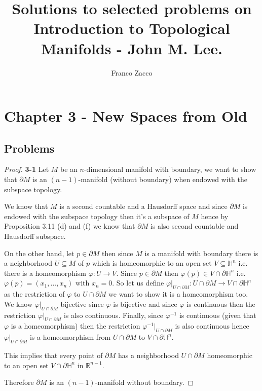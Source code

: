 \documentclass[11pt]{article}
\title{\textbf{Solutions to selected problems on Introduction to Topological Manifolds - John M. Lee.}}
\author{Franco Zacco}
\date{}
\theoremstyle{definition}
\begin{document}
\maketitle
\thispagestyle{empty}

\section*{Chapter 3 - New Spaces from Old}

\subsection*{Problems}

\begin{proof}{\textbf{3-1}}
    Let $M$ be an $n$-dimensional manifold with boundary, we want to show
    that $\partial M$ is an $(n-1)$-manifold (without boundary) when endowed
    with the subspace topology.

    We know that $M$ is a second countable and a Hausdorff space and since
    $\partial M$ is endowed with the subspace topology then it's
    a subspace of $M$ hence by Proposition 3.11 (d) and (f) we know that
    $\partial M$ is also second countable and Hausdorff subspace.

    On the other hand, let $p \in \partial M$ then since $M$ is a manifold
    with boundary there is a neighborhood $U \subseteq M$ of $p$ which is
    homeomorphic to an open set $V \subseteq \mathbb{H}^n$ i.e. there
    is a homeomorphism $\varphi: U \to V$. Since $p \in \partial M$ then
    $\varphi(p) \in V \cap \partial \mathbb{H}^n$ i.e.
    $\varphi(p) = (x_1, ..., x_n)$ with $x_n = 0$.
    So let us define
    $\varphi\big|_{U \cap \partial M}:
    U \cap \partial M \to V \cap \partial\mathbb{H}^n$
     as the restriction of $\varphi$
    to $U \cap \partial M$ we want to show it is a homeomorphism too.
    We know $\varphi\big|_{U \cap \partial M}$ bijective since
    $\varphi$ is bijective and since $\varphi$ is continuous then the
    restriction $\varphi\big|_{U \cap \partial M}$ is also continuous.
    Finally, since $\varphi^{-1}$ is continuous (given that $\varphi$ is
    a homeomorphism) then the restriction
    $\varphi^{-1}\big|_{U \cap \partial M}$ is also continuous hence
    $\varphi\big|_{U \cap \partial M}$ is a homeomorphism from
    $U \cap \partial M$ to $V \cap \partial \mathbb{H}^n$.
    
    This implies that every point of $\partial M$ has a neighborhood
    $U \cap \partial M$ homeomorphic to an open set
    $V \cap \partial \mathbb{H}^n$ in $\mathbb{R}^{n-1}$.
    
    Therefore $\partial M$ is an $(n-1)$-manifold without boundary.    
\end{proof}
\end{document}
